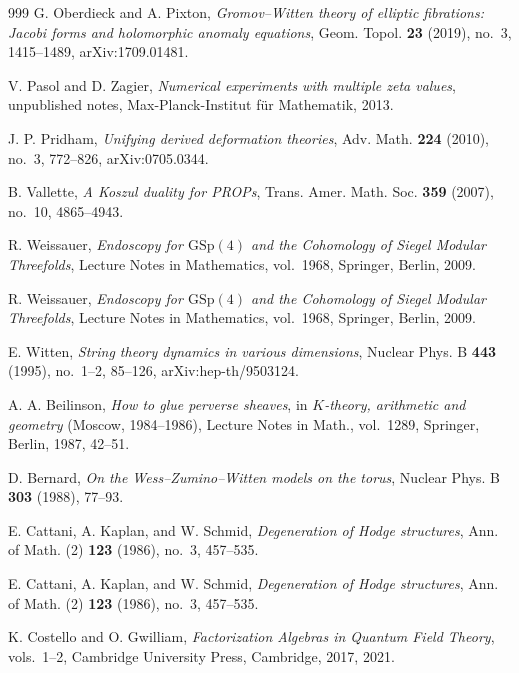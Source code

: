 \begin{thebibliography}{999}
G. Oberdieck and A. Pixton, \emph{Gromov--Witten theory of elliptic fibrations: Jacobi forms and holomorphic anomaly equations}, Geom. Topol. \textbf{23} (2019), no.~3, 1415--1489, arXiv:1709.01481.

V. Pasol and D. Zagier, \emph{Numerical experiments with multiple zeta values}, unpublished notes, Max-Planck-Institut f\"ur Mathematik, 2013.

J. P. Pridham, \emph{Unifying derived deformation theories}, Adv. Math. \textbf{224} (2010), no.~3, 772--826, arXiv:0705.0344.

B. Vallette, \emph{A Koszul duality for PROPs}, Trans. Amer. Math. Soc. \textbf{359} (2007), no.~10, 4865--4943.

R. Weissauer, \emph{Endoscopy for $\mathrm{GSp}(4)$ and the Cohomology of Siegel Modular Threefolds}, Lecture Notes in Mathematics, vol.~1968, Springer, Berlin, 2009.

R. Weissauer, \emph{Endoscopy for $\mathrm{GSp}(4)$ and the Cohomology of Siegel Modular Threefolds}, Lecture Notes in Mathematics, vol.~1968, Springer, Berlin, 2009.

E. Witten, \emph{String theory dynamics in various dimensions}, Nuclear Phys. B \textbf{443} (1995), no.~1--2, 85--126, arXiv:hep-th/9503124.


A. A. Beilinson, \emph{How to glue perverse sheaves}, in \emph{$K$-theory, arithmetic and geometry} (Moscow, 1984--1986), Lecture Notes in Math., vol.~1289, Springer, Berlin, 1987, 42--51.

D. Bernard, \emph{On the Wess--Zumino--Witten models on the torus}, Nuclear Phys. B \textbf{303} (1988), 77--93.

E. Cattani, A. Kaplan, and W. Schmid, \emph{Degeneration of Hodge structures}, Ann. of Math. (2) \textbf{123} (1986), no.~3, 457--535.

E. Cattani, A. Kaplan, and W. Schmid, \emph{Degeneration of Hodge structures}, Ann. of Math. (2) \textbf{123} (1986), no.~3, 457--535.

K. Costello and O. Gwilliam, \emph{Factorization Algebras in Quantum Field Theory}, vols.~1--2, Cambridge University Press, Cambridge, 2017, 2021.


\end{thebibliography}
